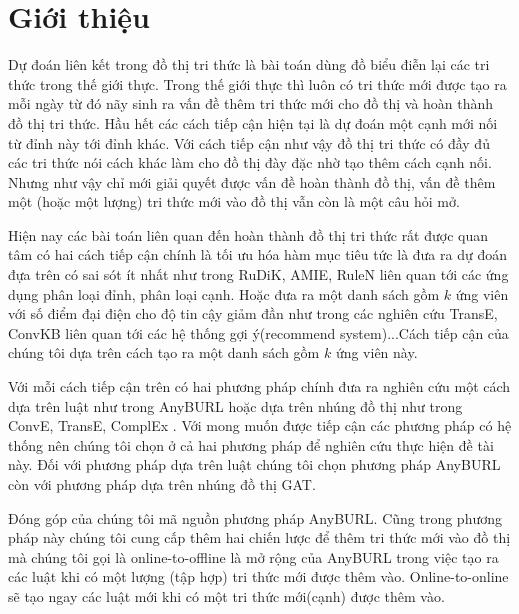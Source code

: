 \chapter{Giới thiệu}
\label{Chapter1}

Dự đoán liên kết trong đồ thị tri thức là bài toán dùng đồ biểu điễn lại các tri thức trong thế giới thực. Trong thế giới thực thì luôn có tri thức mới được tạo ra mỗi ngày từ đó nãy sinh ra vấn đề thêm tri thức mới cho đồ thị và hoàn thành đồ thị tri thức. Hầu hết các cách tiếp cận hiện tại là dự đoán một cạnh mới nối từ đỉnh này tới đỉnh khác. Với cách tiếp cận như vậy đồ thị tri thức có đầy đủ các tri thức nói cách khác làm cho đồ thị đày đặc nhờ tạo thêm cách cạnh nối. Nhưng như vậy chỉ mới giải quyết được vấn đề hoàn thành đồ thị, vấn đề thêm một (hoặc một lượng) tri thức mới vào đồ thị vẫn còn là một câu hỏi mở.

Hiện nay các bài toán liên quan đến hoàn thành đồ thị tri thức rất được quan tâm có hai cách tiếp cận chính là tối ưu hóa hàm mục tiêu tức là đưa ra dự đoán đựa trên có sai sót ít nhất như trong RuDiK\cite{ortona2018robust}, AMIE\cite{galarraga2015fast}, RuleN\cite{meilicke2018fine} liên quan tới các ứng dụng phân loại đỉnh, phân loại cạnh. Hoặc đưa ra một danh sách gồm \(k\) ứng viên với số điểm đại điện cho độ tin cậy giảm đần như trong các nghiên cứu TransE\cite{bordes2013translating}, ConvKB\cite{vu2019capsule} liên quan tới các hệ thống gợi ý(recommend system)...Cách tiếp cận của chúng tôi dựa trên cách tạo ra một danh sách gồm \(k\) ứng viên này.

Với mỗi cách tiếp cận trên có hai phương pháp chính đưa ra nghiên cứu một cách dựa trên luật như trong AnyBURL\cite{burl} hoặc dựa trên nhúng đồ thị như trong ConvE\cite{dettmers2017convolutional}, TransE\cite{bordes2013translating}, ComplEx \cite{trouillon2016complex}. Với mong muốn được tiếp cận các phương pháp có hệ thống nên chúng tôi chọn ở cả hai phương pháp để nghiên cứu thực hiện đề tài này. Đối với phương pháp dựa trên luật chúng tôi chọn phương pháp AnyBURL\cite{burl} còn với phương pháp dựa trên nhúng đồ thị GAT\cite{nathani2019learning}.

Đóng góp của chúng tôi mã nguồn phương pháp AnyBURL. Cũng trong phương pháp này chúng tôi cung cấp thêm hai chiến lược để thêm tri thức mới vào đồ thị mà chúng tôi gọi là online-to-offline là mở rộng của AnyBURL trong việc tạo ra các luật khi có một lượng (tập hợp) tri thức mới được thêm vào. Online-to-online sẽ tạo ngay các luật mới khi có một tri thức mới(cạnh) được thêm vào.

